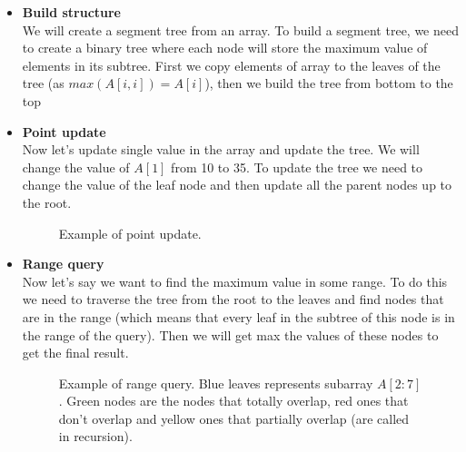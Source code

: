 \documentclass{article}
\begin{document}
\begin{itemize}
    \item \textbf{Build structure} \\
    We will create a segment tree from an array.
    To build a segment tree, we need to create a binary tree where each node will store the maximum value of elements in its subtree.
    First we copy elements of array to the leaves of the tree (as \(max(A[i, i]) = A[i]\)), then we build the tree from bottom to the top \\
    
    \FloatBarrier
    \item \textbf{Point update} \\
    Now let's update single value in the array and update the tree.
    We will change the value of \(A[1]\) from 10 to 35.
    To update the tree we need to change the value of the leaf node 
    and then update all the parent nodes up to the root.
    
    \begin{figure}[H]
        \centering
        
        \caption{Example of point update.}
        \label{fig:segment_tree_2}
    \end{figure}

    \item \textbf{Range query} \\
    Now let's say we want to find the maximum value in some range.
    To do this we need to traverse the tree from the root to the leaves and 
    find nodes that are in the range (which means that every leaf in the subtree of this node is in the range of the query). 
    Then we will get max the values of these nodes to get the final result.

    

    \begin{figure}[H]
        \centering
        
        \caption{Example of range query. Blue leaves represents subarray \(A[2:7]\). Green nodes 
        are the nodes that totally overlap, red ones that don't overlap and yellow ones that partially overlap (are called in recursion).}
        \label{fig:segment_tree_3}
    \end{figure}

\end{itemize}
\end{document}

